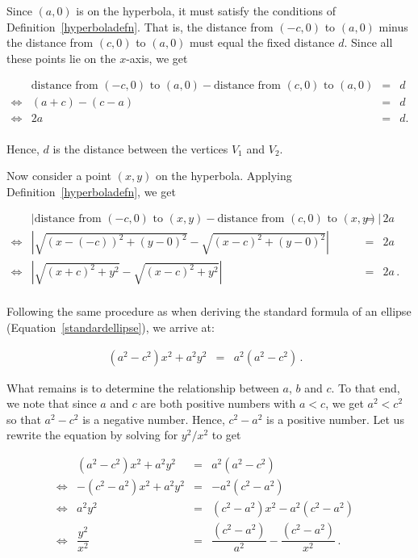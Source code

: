\ifcourse
Since $(a,0)$ is on the hyperbola, it must satisfy the conditions of Definition~\ref{hyperboladefn}.  That is, the distance from $(-c,0)$ to $(a,0)$ minus the distance from $(c,0)$ to $(a,0)$ must equal the fixed distance $d$.  Since all these points lie on the $x$-axis, we get

\[ \begin{array}{rrcl} &\mbox{distance from $(-c,0)$ to $(a,0)$} - \mbox{distance from $(c,0)$ to $(a,0)$} & = & d  \\
\Leftrightarrow&(a+c) - (c-a) & = & d  \\
\Leftrightarrow&2a & = & d. \\ \end{array}\]

\medskip

Hence, $d$ is the distance between the vertices $V_1$ and $V_2$.

Now consider a point $(x,y)$ on the hyperbola.  Applying Definition~\ref{hyperboladefn}, we get


\[ \begin{array}{rrclr} 
&\left|\mbox{distance from  $(-c,0)$ to $(x,y)$} - \mbox{distance from $(c,0)$ to $(x,y)$} \right|& = & 2a & \\ 
\Leftrightarrow&\left|\sqrt{(x-(-c))^2+(y-0)^2} - \sqrt{(x-c)^2+(y-0)^2} \right|& = & 2a & \\ 
\Leftrightarrow&\left|\sqrt{(x+c)^2+y^2} - \sqrt{(x-c)^2+y^2} \right|& = & 2a \,. \\ \end{array}\]

\medskip

Following the same procedure as when deriving the standard formula of an ellipse (Equation~\eqref{standardellipse}), we arrive at:

\[ \begin{array}{rclr} \left(a^2 - c^2\right) x^2 +a^2 y^2 & = & a^2 \left(a^2 - c^2\right)\,.  & \end{array}\]

What remains is to determine the relationship between $a$, $b$ and $c$.  To that end, we note that since $a$ and $c$ are both positive numbers with $a < c$, we get $a^2 < c^2$ so that $a^2 - c^2$ is a negative number.  Hence, $c^2 - a^2$ is a positive number. Let us rewrite the equation by solving for $y^2/x^2$ to get
 
\[ \begin{array}{rrclr} 
&\left(a^2 - c^2\right) x^2 +a^2 y^2 & = & a^2 \left(a^2 - c^2\right)  & \\
\Leftrightarrow&-\left(c^2 - a^2\right) x^2 +a^2 y^2 & = & -a^2 \left(c^2 - a^2\right)  & \\
\Leftrightarrow&a^2 y^2 & = &  \left(c^2 - a^2\right) x^2 -  a^2\left(c^2 - a^2\right)& \\
\Leftrightarrow&\dfrac{y^2}{x^2} & = &  \dfrac{\left(c^2 - a^2\right)}{a^2} -  \dfrac{\left(c^2 - a^2\right)}{x^2}\,.& \\ \end{array}\]

